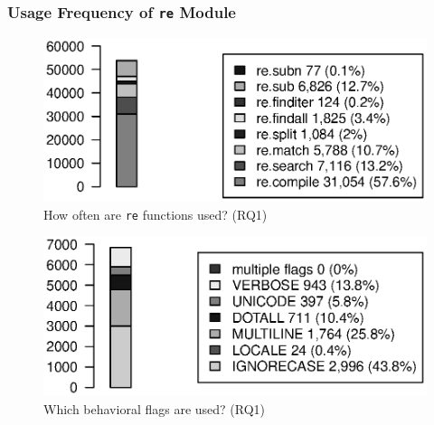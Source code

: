 




\subsubsection{Usage Frequency of {\tt re} Module}

\begin{figure}[tb]
\centering
\includegraphics[width=\columnwidth]{../analysis_output/partFunctions.eps}
\vspace{-6pt}
\caption{How often are  {\tt re} functions used? (RQ1)}
\vspace{-6pt}
\label{fig:partFunctions}
\end{figure}

\begin{figure}[tb]
\centering
\includegraphics[width=0.9\columnwidth]{../analysis_output/partFlags.eps}
\vspace{-6pt}
\caption{Which behavioral flags are used? (RQ1)}
\label{fig:partFlags}
\end{figure}

